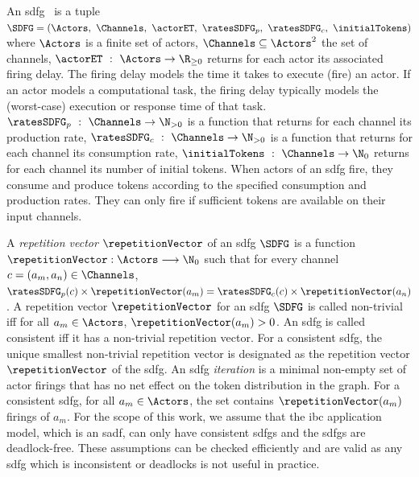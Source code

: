 An \gls{sdfg}~\cite{lee1987synchronous} is a tuple $\SDFG = (\Actors,\ \Channels,\ \actorET,\ \ratesSDFG_p,\ \ratesSDFG_c,\ \initialTokens)$
where $\Actors$ is a finite set of actors, $\Channels \subseteq \Actors^2$ the set of channels,
$\actorET \ :\ \Actors \rightarrow \R_{\geq 0}$ returns for each actor its associated firing delay. The firing delay models the time it takes to execute (fire) an actor. If an actor models a computational task, the firing delay typically models the (worst-case) execution or response time of that task.
$\ratesSDFG_p \ :\ \Channels \rightarrow \N_{> 0}$ is a function that returns for each channel its production rate,
$\ratesSDFG_c \ :\ \Channels \rightarrow \N_{> 0}$ is a function that returns for each channel its consumption rate,
$\initialTokens \ :\ \Channels \rightarrow \N_{0}$ returns for each channel its number of
initial tokens. When actors of an \gls{sdfg} fire, they consume and produce tokens according to the specified consumption and production rates. They can only fire if sufficient tokens are available on their input channels.

A \emph{repetition vector} $\repetitionVector$ of an \gls{sdfg} $\SDFG$ is a function $\repetitionVector: \Actors \longrightarrow \N_0$ such that for every channel $c=(a_m,a_n)\in \Channels$, $\ratesSDFG_p(c) \times \repetitionVector(a_m)=\ratesSDFG_c(c) \times \repetitionVector(a_n)$.
A repetition vector $\repetitionVector$ for an \gls{sdfg} $\SDFG$ is called non-trivial iff for all $a_m \in \Actors$, $\repetitionVector(a_m) > 0$.
An \gls{sdfg} is called consistent iff it has a non-trivial repetition vector. 
For a consistent \gls{sdfg}, the unique smallest non-trivial repetition vector is designated as the repetition vector $\repetitionVector$ of the \gls{sdfg}. 
An \gls{sdfg} \emph{iteration} is a minimal non-empty set of actor firings that has no net effect on the token distribution in the graph. For a consistent \gls{sdfg}, for all $a_m\in \Actors$, the set contains $\repetitionVector(a_m)$ firings of $a_m$. 
For the scope of this work, we assume that the \gls{ibc} application model, which is an \gls{sadf}, can only have consistent \glspl{sdfg} and the \glspl{sdfg} are deadlock-free. These assumptions can be checked efficiently and are valid as any \gls{sdfg} which is inconsistent or deadlocks is not useful in practice. 

